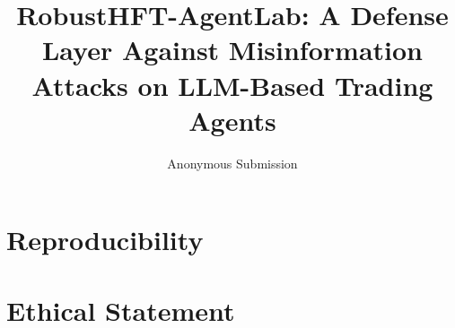 \documentclass[letterpaper]{article} %
\title{RobustHFT-AgentLab: A Defense Layer Against Misinformation Attacks on LLM-Based Trading Agents}
\author{Anonymous Submission}
\begin{document}
\maketitle

\begin{abstract}

\end{abstract}











\section*{Reproducibility}


\section*{Ethical Statement}




\appendix

\end{document}

